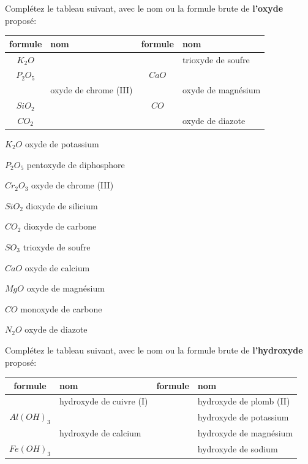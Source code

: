 \documentclass[
  11pt,
  french,
  a4paper,
  openany]{book}
\begin{document}
\begin{Exercise}
Complétez le tableau suivant, avec le nom ou la formule brute de \textbf{l'oxyde} proposé:

\end{Exercise}

\begin{longtable}[]{@{}clcl@{}}
\toprule
formule & nom & formule & nom\tabularnewline
\midrule
\endhead
\(K_2O\) & & & trioxyde de soufre\tabularnewline
\(P_2O_5\) & & \(CaO\) &\tabularnewline
& oxyde de chrome (III) & & oxyde de magnésium\tabularnewline
\(SiO_2\) & & \(CO\) &\tabularnewline
\(CO_2\) & & & oxyde de diazote\tabularnewline
\bottomrule
\end{longtable}

\begin{Answer}

\begin{multicols}{2}
\(K_2O\) oxyde de potassium

\(P_2O_5\) pentoxyde de diphosphore

\(Cr_2O_3\) oxyde de chrome (III)

\(SiO_2\) dioxyde de silicium

\(CO_2\) dioxyde de carbone

\(SO_3\) trioxyde de soufre

\(CaO\) oxyde de calcium

\(MgO\) oxyde de magnésium

\(CO\) monoxyde de carbone

\(N_2O\) oxyde de diazote

\end{multicols}


\end{Answer}

\begin{Exercise}
Complétez le tableau suivant, avec le nom ou la formule brute de \textbf{l'hydroxyde} proposé:

\end{Exercise}

\begin{longtable}[]{@{}clcl@{}}
\toprule
formule & nom & formule & nom\tabularnewline
\midrule
\endhead
& hydroxyde de cuivre (I) & & hydroxyde de plomb (II)\tabularnewline
\(Al(OH)_3\) & & & hydroxyde de potassium\tabularnewline
& hydroxyde de calcium & & hydroxyde de magnésium\tabularnewline
\(Fe(OH)_3\) & & & hydroxyde de sodium\tabularnewline
\bottomrule
\end{longtable}
\end{document}
